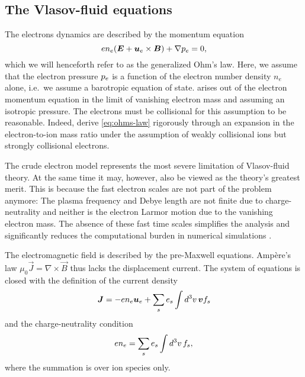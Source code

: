 \documentclass[aps,pre,notitlepage,amsmath,amssymb,amsfonts,nobibnotes,nofootinbib,superscriptaddress]{revtex4-1}
\begin{document}
\subsection{The Vlasov-fluid equations}

The electrons dynamics are described by the momentum equation
\begin{equation}
  \label{eq:ohms-law}
  e n_e(\vec{E} + \ue\times\vec{B}) + \nabla\pe = 0,
\end{equation}
which we will henceforth refer to as the generalized Ohm's law. Here, we
assume that the electron pressure $p_e$ is a function of the electron number
density $n_e$ alone, i.e.\ we assume a barotropic equation of state.
 arises out of the electron momentum equation in the limit
of vanishing electron mass and assuming an isotropic pressure. The electrons
must be collisional for this assumption to be reasonable. Indeed,
\citet{Rosin2011} derive \cref{eq:ohms-law} rigorously through an expansion in
the electron-to-ion mass ratio under the assumption of weakly collisional ions
but strongly collisional electrons.

The crude electron model represents the most severe limitation of Vlasov-fluid
theory. At the same time it may, however, also be viewed as the theory's
greatest merit. This is because the fast electron scales are not part of the
problem anymore: The plasma frequency and Debye length are not finite due to
charge-neutrality and neither is the electron Larmor motion due to the
vanishing electron mass. The absence of these fast time scales simplifies the
analysis and significantly reduces the computational burden in numerical
simulations \citep{Byers1978,Winske2003,Kunz2014}.

The electromagnetic field is described by the pre-Maxwell equations. Ampère's
law $\mu_0\vec{J}=\nabla\times\vec{B}$ thus lacks the displacement current.
The system of equations is closed with the definition of the current density
\begin{equation}
  \label{eq:current}
  \vec{J} = -en_e\vec{u}_e + \sums \qs\int d^3v\,\vec{v} f_s%
\end{equation}
and the charge-neutrality condition
\begin{equation}
  \label{eq:charge-neutrality}
   en_e = \sums \qs\int d^3v\,f_s,
\end{equation}
where the summation is over ion species only.
\end{document}
